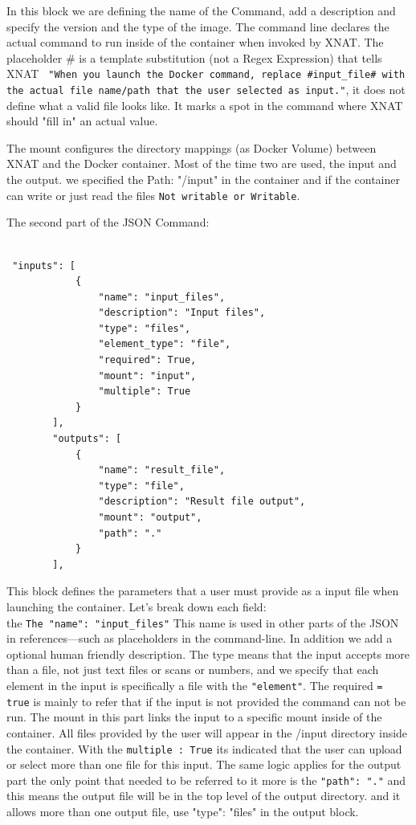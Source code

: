 In this block we are  defining the name of the Command, add a description and specify the version and the type of the image.
The command line declares the actual command to run inside of the container when invoked by XNAT. The placeholder \# is a template substitution (not a Regex Expression)  that tells XNAT \texttt{ "When you launch the Docker command, replace \#input\_file\# with the actual file name/path that the user selected as input."}, it does not define what a valid file looks like. It marks a spot in the command where XNAT should "fill in" an actual value.

The mount configures the directory mappings (as Docker Volume) between XNAT and the Docker container. Most of the time two are used, the input and the output.
we specified the Path: "/input" in the container and if the container can write or just read the files  \texttt{Not writable or Writable}.

The second part of the JSON Command:


\begin{lstlisting}

 "inputs": [
            {
                "name": "input_files",
                "description": "Input files",
                "type": "files",
                "element_type": "file",
                "required": True,
                "mount": "input",
                "multiple": True
            }
        ],
        "outputs": [
            {
                "name": "result_file",
                "type": "file",
                "description": "Result file output",
                "mount": "output",
                "path": "."
            }
        ],
\end{lstlisting}


This block defines the parameters that a user must provide as a input file when launching the container. 
Let's break down each field:\\

the \texttt{The "name": "input\_files"}  This name is used in other parts of the JSON in references—such as placeholders in the command-line. In addition we add a optional human friendly description. The type means that the input accepts more than a file, not just text files or scans or numbers, and we specify that each element in the input is specifically a file with  the \texttt{"element"}.
The required \texttt{= true} is mainly to refer that if the input is not provided the command can not be run. The mount in this part links the input to a specific mount inside of the container. All files provided by the user will appear in the /input directory inside the container. With the \texttt{multiple : True} its indicated that the user can upload or select more than one file for this input.
The same logic applies for the output part the only point that needed to be referred to it more is the \texttt{"path": "."} and this means the output file will be in the top level of the \/output directory. and it allows more than one output file, use "type": "files" in the output block.

